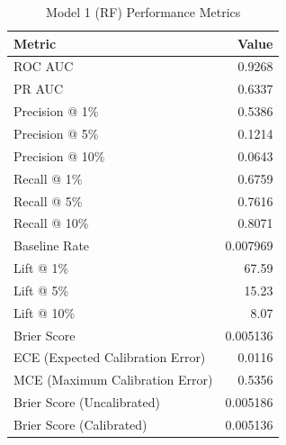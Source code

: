 \begin{table}[h]
\centering
\begin{tabular}{lr}
\toprule
Metric & Value \\
\midrule
ROC AUC & 0.9268 \\
PR AUC & 0.6337 \\
Precision @ 1\% & 0.5386 \\
Precision @ 5\% & 0.1214 \\
Precision @ 10\% & 0.0643 \\
Recall @ 1\% & 0.6759 \\
Recall @ 5\% & 0.7616 \\
Recall @ 10\% & 0.8071 \\
Baseline Rate & 0.007969 \\
Lift @ 1\% & 67.59 \\
Lift @ 5\% & 15.23 \\
Lift @ 10\% & 8.07 \\
Brier Score & 0.005136 \\
ECE (Expected Calibration Error) & 0.0116 \\
MCE (Maximum Calibration Error) & 0.5356 \\
Brier Score (Uncalibrated) & 0.005186 \\
Brier Score (Calibrated) & 0.005136 \\
\bottomrule
\end{tabular}
\caption{Model 1 (RF) Performance Metrics}
\label{tab:model1_rf_metrics}
\end{table}

